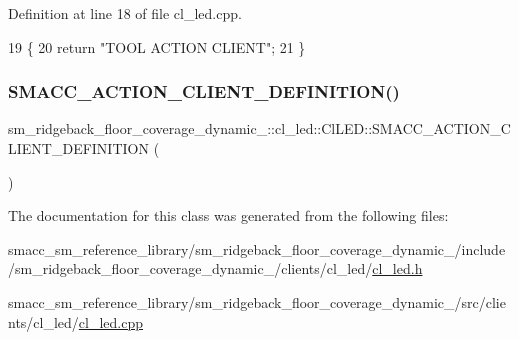Definition at line 18 of file cl\+\_\+led.\+cpp.


\begin{DoxyCode}
19 \{
20     \textcolor{keywordflow}{return} \textcolor{stringliteral}{"TOOL ACTION CLIENT"};
21 \}
\end{DoxyCode}
\mbox{\label{classsm__ridgeback__floor__coverage__dynamic__1_1_1cl__led_1_1ClLED_ab34fe87843822fca4b46d3293cd14ae3}} 
\subsubsection{\texorpdfstring{S\+M\+A\+C\+C\+\_\+\+A\+C\+T\+I\+O\+N\+\_\+\+C\+L\+I\+E\+N\+T\+\_\+\+D\+E\+F\+I\+N\+I\+T\+I\+O\+N()}{SMACC\_ACTION\_CLIENT\_DEFINITION()}}
{\footnotesize\ttfamily sm\+\_\+ridgeback\+\_\+floor\+\_\+coverage\+\_\+dynamic\+\_\+::cl\+\_\+led\+::\+Cl\+L\+E\+D\+::\+S\+M\+A\+C\+C\+\_\+\+A\+C\+T\+I\+O\+N\+\_\+\+C\+L\+I\+E\+N\+T\+\_\+\+D\+E\+F\+I\+N\+I\+T\+I\+ON (\begin{DoxyParamCaption}\item[{sm\+\_\+ridgeback\+\_\+floor\+\_\+coverage\+\_\+dynamic\+\_\+1\+::\+L\+E\+D\+Control\+Action}]{ }\end{DoxyParamCaption})}



The documentation for this class was generated from the following files\+:\begin{DoxyCompactItemize}
\item 
smacc\+\_\+sm\+\_\+reference\+\_\+library/sm\+\_\+ridgeback\+\_\+floor\+\_\+coverage\+\_\+dynamic\+\_/include/sm\+\_\+ridgeback\+\_\+floor\+\_\+coverage\+\_\+dynamic\+\_/clients/cl\+\_\+led/\hyperlink{sm__ridgeback__floor__coverage__dynamic__1_2include_2sm__ridgeback__floor__coverage__dynamic__1_2clients_2cl__led_2cl__led_8h}{cl\+\_\+led.\+h}\item 
smacc\+\_\+sm\+\_\+reference\+\_\+library/sm\+\_\+ridgeback\+\_\+floor\+\_\+coverage\+\_\+dynamic\+\_/src/clients/cl\+\_\+led/\hyperlink{sm__ridgeback__floor__coverage__dynamic__1_2src_2clients_2cl__led_2cl__led_8cpp}{cl\+\_\+led.\+cpp}\end{DoxyCompactItemize}
